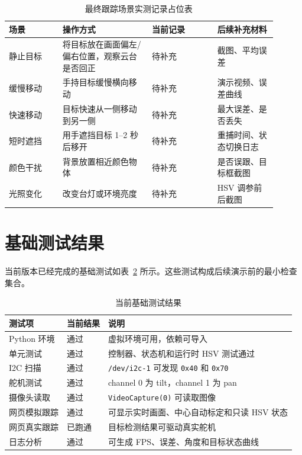 \documentclass[
  oneside,
  degree=bachelor,
  field=science,
  fullwidthstop=circle,
  fontset=windows,
  times=false,
  minted=false,
  biblatex=false,
  algo=algpseudocode,
]{tongjithesis}
\newcommand{\code}[1]{\texttt{#1}}
\begin{document}
\begin{table}[htbp]
  \centering
  \caption{最终跟踪场景实测记录占位表}
  \label{tab:tracking-scenarios}
  \footnotesize
  \setlength{\tabcolsep}{4pt}
  \begin{tabular}{p{0.18\linewidth}p{0.30\linewidth}p{0.22\linewidth}p{0.20\linewidth}}
    \toprule
    场景 & 操作方式 & 当前记录 & 后续补充材料 \\
    \midrule
    静止目标 & 将目标放在画面偏左/偏右位置，观察云台是否回正 & 待补充 & 截图、平均误差 \\
    缓慢移动 & 手持目标缓慢横向移动 & 待补充 & 演示视频、误差曲线 \\
    快速移动 & 目标快速从一侧移动到另一侧 & 待补充 & 最大误差、是否丢失 \\
    短时遮挡 & 用手遮挡目标 1--2 秒后移开 & 待补充 & 重捕时间、状态切换日志 \\
    颜色干扰 & 背景放置相近颜色物体 & 待补充 & 是否误跟、目标框截图 \\
    光照变化 & 改变台灯或环境亮度 & 待补充 & HSV 调参前后截图 \\
    \bottomrule
  \end{tabular}
\end{table}

\section{基础测试结果}

当前版本已经完成的基础测试如表~\ref{tab:basic-tests} 所示。这些测试构成后续演示前的最小检查集合。

\begin{table}[htbp]
  \centering
  \caption{当前基础测试结果}
  \label{tab:basic-tests}
  \begin{tabular}{lll}
    \toprule
    测试项 & 当前结果 & 说明 \\
    \midrule
    Python 环境 & 通过 & 虚拟环境可用，依赖可导入 \\
    单元测试 & 通过 & 控制器、状态机和运行时 HSV 测试通过 \\
    I2C 扫描 & 通过 & \code{/dev/i2c-1} 可发现 \code{0x40} 和 \code{0x70} \\
    舵机测试 & 通过 & channel 0 为 tilt，channel 1 为 pan \\
    摄像头读取 & 通过 & \code{VideoCapture(0)} 可读取图像 \\
    网页模拟跟踪 & 通过 & 可显示实时画面、中心自动标定和只读 HSV 状态 \\
    网页真实跟踪 & 已跑通 & 目标检测结果可驱动真实舵机 \\
    日志分析 & 通过 & 可生成 FPS、误差、角度和目标状态曲线 \\
    \bottomrule
  \end{tabular}
\end{table}
\end{document}
